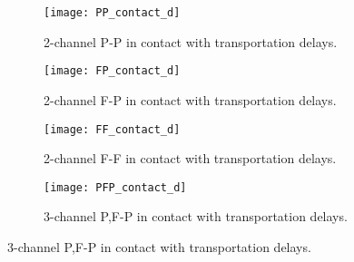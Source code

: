 \newpage

\begin{figure}[H]
\begin{minipage}{0.5\textwidth}
\begin{figure}[H]
\centering
\texttt{[image: PP\_contact\_d]}
\caption{2-channel P-P in contact with transportation delays.}
\label{fig:pp_contact_d}
\end{figure}
\begin{figure}[H]
\centering
\texttt{[image: FP\_contact\_d]}
\caption{2-channel F-P in contact with transportation delays.}
\label{fig:fp_contact_d}
\end{figure}
\end{minipage}
\begin{minipage}{0.5\textwidth}
\begin{figure}[H]
\centering
\texttt{[image: FF\_contact\_d]}
\caption{2-channel F-F in contact with transportation delays.}
\label{fig:ff_contact_d}
\end{figure}
\begin{figure}[H]
\centering
\texttt{[image: PFP\_contact\_d]}
\caption{3-channel P,F-P in contact with transportation delays.}
\label{fig:pfp_contact_d}
\end{figure}
\end{minipage}
\end{figure}